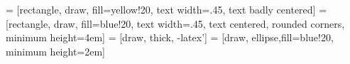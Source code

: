 = [rectangle, draw, fill=yellow!20, text width=.45\textwidth, text badly centered]
 = [rectangle, draw, fill=blue!20,
    text width=.45\textwidth, text centered, rounded corners, minimum height=4em]
 = [draw, thick, -latex']
 = [draw, ellipse,fill=blue!20, minimum height=2em]
\def\svgwidth{.8\textwidth}
\newsavebox{\mysquareLow}
\savebox{\mysquareLow}{%
  \raisebox{-0.08em}{%
    \textcolor{black}{%
      \rule{.7em}{.7em}%
    }%
    \hspace{-.65em}%
    \raisebox{.05em}{%
      \textcolor{lowActivity}{%
	\rule{.6em}{.6em}%
      }%
    }%
  }%
}
\newsavebox{\mysquareHigh}
\savebox{\mysquareHigh}{%
  \raisebox{-0.08em}{%
    \textcolor{black}{%
      \rule{.7em}{.7em}%
    }%
    \hspace{-.65em}%
    \raisebox{.05em}{%
      \textcolor{highActivity}{%
	\rule{.6em}{.6em}%
      }%
    }%
  }%
}

